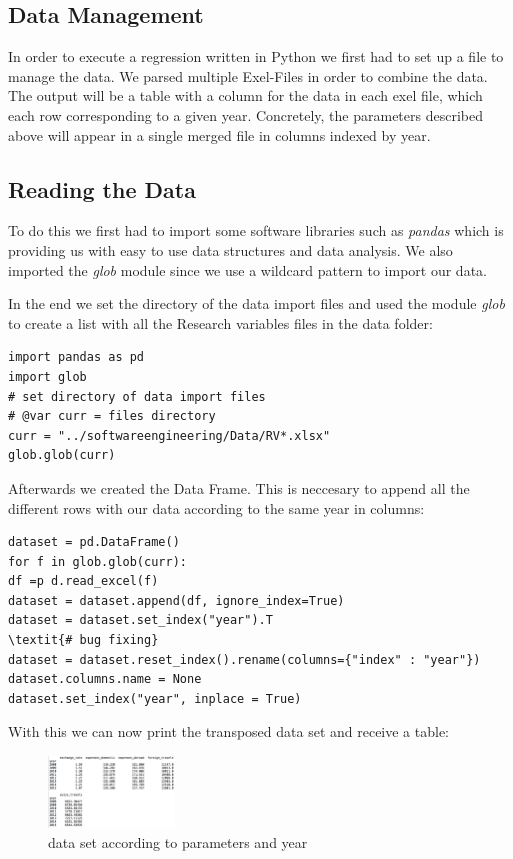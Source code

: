 \documentclass[12pt,a4paper,bibliography=totocnumbered,listof=totocnumbered]{scrartcl}
\begin{document}
\subsection{Data Management}
In order to execute a regression written in Python we first had to set up a file to manage the data. We parsed multiple Exel-Files in order to combine the data. The output will be a table with a column for the data in each exel file, which each row corresponding to a given year. Concretely, the parameters described above will appear in a single merged file in columns indexed by year. 
\subsection{Reading the Data}

To do this we first had to import some software libraries such as \textit{pandas} which is providing us with easy to use data structures and data analysis. We also imported the \textit{glob} module since we use a wildcard pattern to import our data. 

In the end we set the directory of the data import files and used the module \textit{glob} to create a list with all the Research variables files in the data folder:

\begin{verbatim}
import pandas as pd
import glob
# set directory of data import files
# @var curr = files directory
curr = "../softwareengineering/Data/RV*.xlsx"
glob.glob(curr)
\end{verbatim}


Afterwards we created the Data Frame. This is neccesary to append all the different rows with our data according to the same year in columns:
\begin{verbatim}
dataset = pd.DataFrame()
for f in glob.glob(curr):
df =p d.read_excel(f)
dataset = dataset.append(df, ignore_index=True)
dataset = dataset.set_index("year").T
\textit{# bug fixing}
dataset = dataset.reset_index().rename(columns={"index" : "year"})
dataset.columns.name = None
dataset.set_index("year", inplace = True)
\end{verbatim}

With this we can now print the transposed data set and receive a table:

\begin{figure}[htbp] 
  \centering
     \includegraphics[width=0.3\textwidth]{data_table}
  \caption{data set according to parameters and year }
  \label{fig: figure2}
\end{figure}
\end{document}
